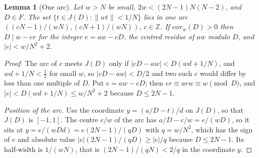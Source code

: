 \documentclass[11pt]{article}
\newtheorem{lemma}[theorem]{Lemma}
\theoremstyle{definition}
\theoremstyle{remark}
\newcommand{\nd}[1]{\lVert #1\rVert}
\newcommand{\ZZ}{\mathbb{Z}}
\begin{document}
\begin{lemma}[One arc]\label{lem:L2}
Let $w>N$ be small, $2w<(2N-1)N(N-2)$, and $D\in F$. The set $\{t\in J(D):\nd{wt}<1/N\}$ lies in one arc $((cN-1)/(wN),(cN+1)/(wN))$, $c\in\ZZ$. If $\mathrm{cov}_w(D)>0$ then $D\mid w-er$ for the integer $e=aw-cD$, the centred residue of $aw$ modulo $D$, and $|e|<w/N^2+2$.
\end{lemma}
\begin{proof}
The arc of $c$ meets $J(D)$ only if $|cD-aw|<D(wd+1/N)$, and $wd+1/N<\frac12$ for small $w$, so $|cD-aw|<D/2$ and two such $c$ would differ by less than one multiple of $D$. Put $e=aw-cD$; then $er\equiv arw\equiv w\pmod D$, and $|e|<D(wd+1/N)\le w/N^2+2$ because $D\le2N-1$.

\emph{Position of the arc.} Use the coordinate $y=(a/D-t)/d$ on $J(D)$, so that $J(D)$ is $[-1,1]$. The centre $c/w$ of the arc has $a/D-c/w=e/(wD)$, so it sits at $y=e/(wDd)=e(2N-1)/(qD)$ with $q=w/N^2$, which has the sign of $e$ and absolute value $|e|(2N-1)/(qD)\ge|e|/q$ because $D\le2N-1$. Its half-width is $1/(wN)$, that is $(2N-1)/(qN)<2/q$ in the coordinate $y$.
\end{proof}
\end{document}
